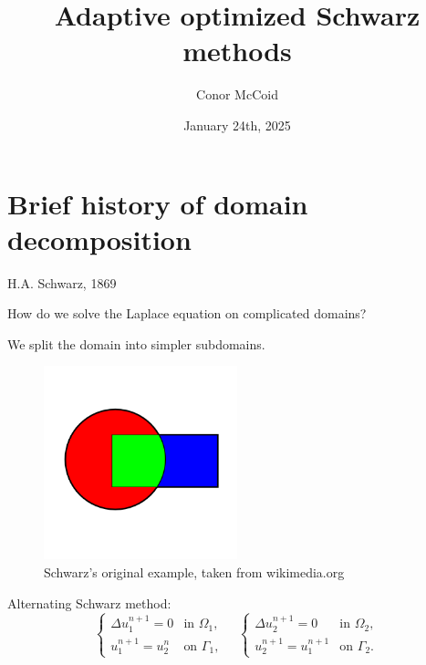 \documentclass{beamer}
\title{Adaptive optimized Schwarz methods}
\author{Conor McCoid}
\institute{McMaster University}
\date{January 24th, 2025}
\begin{document}
\maketitle

\section{Brief history of domain decomposition} %

\begin{frame}{H.A. Schwarz, 1869}

How do we solve the Laplace equation on complicated domains?

We split the domain into simpler subdomains.

\begin{figure}
\vspace{-3em}
\includegraphics[width=0.5\textwidth]{AOSM/FIG_keyhole.png}
\vspace{-4em}
\caption{Schwarz's original example, taken from wikimedia.org}
\end{figure}

Alternating Schwarz method:
\begin{equation*}
	\begin{cases} \Delta u_1^{n+1} = 0 & \text{in } \Omega_1, \\ u_1^{n+1} = u_2^n & \text{on } \Gamma_1, \end{cases}
	\quad
	\begin{cases} \Delta u_2^{n+1} = 0 & \text{in } \Omega_2, \\ u_2^{n+1} = u_1^{n+1} & \text{on } \Gamma_2. \end{cases}
\end{equation*}
\end{frame}
\end{document}
